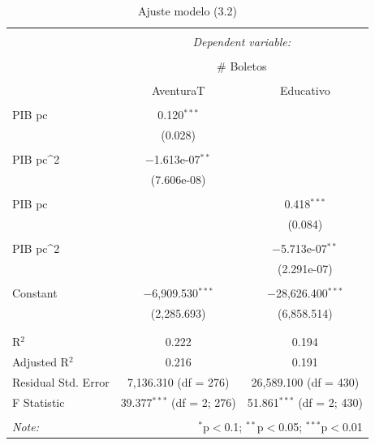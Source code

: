 \begin{table}[H]
\centering 
  \caption{Ajuste modelo (3.2)} 
  \label{lm-x2} 
\begin{tabular}{@{\extracolsep{5pt}}lcc} 
\\[-1.8ex]\hline 
\hline \\[-1.8ex] 
 & \multicolumn{2}{c}{\textit{Dependent variable:}} \\ 
\cline{2-3} 
\\[-1.8ex] & \multicolumn{2}{c}{\# Boletos} \\ 
\\[-1.8ex] & AventuraT & Educativo\\ 
\hline \\[-1.8ex] 
 PIB pc & 0.120$^{***}$ &  \\ 
  & (0.028) &  \\ 
  & & \\ 
 PIB pc^2 & $-$1.613e-07$^{**}$ &  \\ 
  & (7.606e-08) &  \\ 
  & & \\ 
 PIB pc &  & 0.418$^{***}$ \\ 
  &  & (0.084) \\ 
  & & \\ 
 PIB pc^2 &  & $-$5.713e-07$^{**}$ \\ 
  &  & (2.291e-07) \\ 
  & & \\ 
 Constant & $-$6,909.530$^{***}$ & $-$28,626.400$^{***}$ \\ 
  & (2,285.693) & (6,858.514) \\ 
  & & \\ 
\hline \\[-1.8ex] 
R$^{2}$ & 0.222 & 0.194 \\ 
Adjusted R$^{2}$ & 0.216 & 0.191 \\ 
Residual Std. Error & 7,136.310 (df = 276) & 26,589.100 (df = 430) \\ 
F Statistic & 39.377$^{***}$ (df = 2; 276) & 51.861$^{***}$ (df = 2; 430) \\ 
\hline 
\hline \\[-1.8ex] 
\textit{Note:}  & \multicolumn{2}{r}{$^{*}$p$<$0.1; $^{**}$p$<$0.05; $^{***}$p$<$0.01} \\ 
\end{tabular} 
\end{table}


